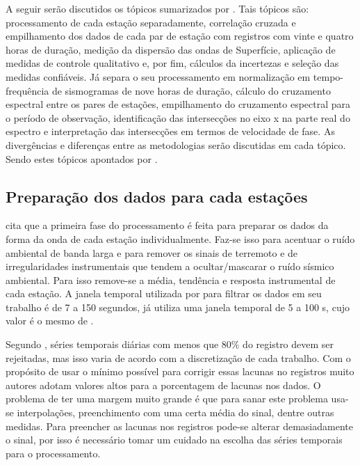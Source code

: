 \documentclass[paper,twocolumn]{geophysics}
\begin{document}
A seguir serão discutidos os tópicos sumarizados por \cite{bensen_processing_2007}. Tais tópicos são: processamento de cada estação separadamente, correlação cruzada e empilhamento dos dados de cada par de estação com registros com vinte e quatro horas de duração, medição da dispersão das ondas de Superfície, aplicação de medidas de controle qualitativo e, por fim, cálculos da incertezas e seleção das medidas confiáveis.  Já \cite{ekstrom_determination_2009} separa o seu processamento em  normalização em tempo-frequência de sismogramas de nove horas de duração, cálculo do cruzamento espectral entre os pares de estações, empilhamento do cruzamento espectral para o período de observação, identificação das intersecções no eixo x na parte real do espectro e interpretação das intersecções em termos de velocidade de fase. As divergências e diferenças entre as metodologias serão discutidas em cada tópico. Sendo estes tópicos apontados por \cite{bensen_processing_2007}.

\subsection*{Preparação dos dados para cada estações}

\cite{bensen_processing_2007} cita que a primeira fase do processamento  é feita para preparar os dados da forma da onda de cada estação individualmente. Faz-se isso para acentuar o ruído ambiental de banda larga e para remover os sinais de terremoto e de irregularidades instrumentais que tendem a ocultar/mascarar o ruído sísmico ambiental. Para isso remove-se a média, tendência e resposta instrumental de cada estação. A janela temporal  utilizada por \cite{bensen_processing_2007} para filtrar os dados em seu trabalho é de 7 a 150 segundos, já \cite{lin_surface_2008} utiliza uma janela temporal de 5 a 100 s, cujo valor é o mesmo de \cite{ekstrom_determination_2009}.

Segundo \cite{bensen_processing_2007}, séries temporais diárias com menos que 80\% do registro devem ser rejeitadas, mas isso varia de acordo com a discretização de cada trabalho. Com o propósito de usar o mínimo possível para corrigir essas lacunas no registros muito autores adotam valores altos para a porcentagem de lacunas nos dados. O problema de ter uma margem muito grande é que para sanar este problema usa-se interpolações, preenchimento com uma certa média do sinal, dentre outras medidas. Para preencher as lacunas nos registros pode-se alterar demasiadamente o sinal, por isso é necessário tomar um cuidado na escolha das séries temporais para o processamento.
\end{document}
